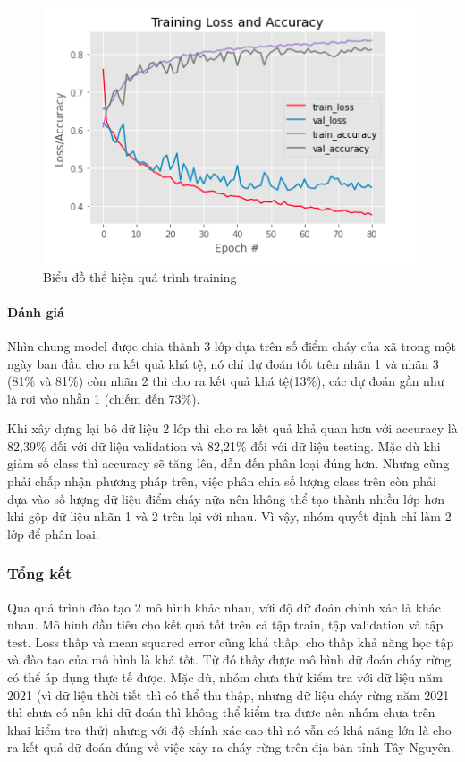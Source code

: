 \documentclass{article}
\begin{document}
\begin{figure}[H]
	\centering
	\includegraphics[width=6in]{images/loss_acc_model2_1.png}
	\caption{Biểu đồ thể hiện quá trình training}
\end{figure}

\paragraph{Đánh giá}

Nhìn chung model được chia thành 3 lớp dựa trên số điểm cháy của xã trong một ngày ban đầu cho ra kết quả khá tệ, nó chỉ dự đoán tốt trên nhãn 1 và nhãn 3 (81\% và 81\%) còn nhãn 2 thì cho ra kết quả khá tệ(13\%), các dự đoán gần như là rơi vào nhẵn 1 (chiếm đến 73\%).

Khi xây dựng lại bộ dữ liệu 2 lớp thì cho ra kết quả khả quan hơn với accuracy là 82,39\% đối với dữ liệu validation và 82,21\% đối với dữ liệu testing. Mặc dù khi giảm số class thì accuracy sẽ tăng lên, dẫn đến phân loại đúng hơn. Nhưng cũng phải chấp nhận phương pháp trên, việc phân chia số lượng class trên còn phải dựa vào số lượng dữ liệu điểm cháy nữa nên không thể tạo thành nhiều lớp hơn khi gộp dữ liệu nhãn 1 và 2 trên lại với nhau. Vì vậy, nhóm quyết định chỉ làm 2 lớp để phân loại.

\subsubsection{Tổng kết}

Qua quá trình đào tạo 2 mô hình khác nhau, với độ dữ đoán chính xác là khác nhau. Mô hình đầu tiên cho kết quả tốt trên cả tập train, tập validation và tập test. Loss thấp và mean squared error cũng khá thấp, cho thấp khả năng học tập và đào tạo của mô hình là khá tốt. Từ đó thấy được mô hình dữ đoán cháy rừng có thể áp dụng thực tế được. Mặc dù, nhóm chưa thử kiểm tra với dữ liệu năm 2021 (vì dữ liệu thời tiết thì có thể thu thập, nhưng dữ liệu cháy rừng năm 2021 thì chưa có nên khi dữ đoán thì không thể kiểm tra đươc nên nhóm chưa trên khai kiểm tra thử) nhưng với độ chính xác cao thì nó vẫn có khả năng lớn là cho ra kết quả dữ đoán đúng về việc xảy ra cháy rừng trên địa bàn tỉnh Tây Nguyên.
\end{document}
